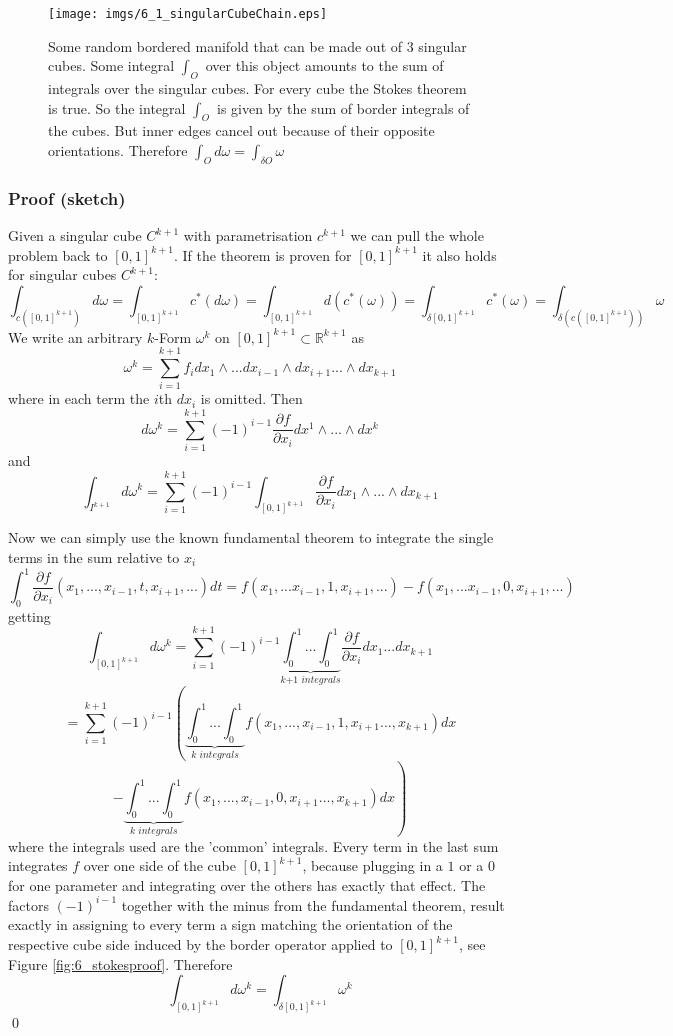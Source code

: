 \begin{figure}[t]
\begin{center}
\texttt{[image: imgs/6\_1\_singularCubeChain.eps]}
\end{center}
\caption{Some random bordered manifold that can be made out of 3 singular cubes. Some integral $\int_O$ over this object amounts to the sum of integrals over the singular cubes. For every cube the Stokes theorem is true. So the integral $\int_O$ is given by the sum of border integrals of the cubes. But inner edges cancel out because of their opposite orientations. Therefore $\int_O d\omega= \int_{\delta O}\omega$} 
\label{fig::6_1_singularCubes}
\end{figure}

\subsubsection{Proof (sketch)}

Given a singular cube $C^{k+1}$ with parametrisation $c^{k+1}$ we can pull the whole problem back to $[0,1]^{k+1}$. If the theorem is proven for $[0,1]^{k+1}$ it also holds for singular cubes $C^{k+1}$:
\[\int_{c([0,1]^{k+1})}d \omega = \int_{[0,1]^{k+1}} c^*(d\omega) = \int_{[0,1]^{k+1}} d(c^*(\omega)) = \int_{\delta [0,1]^{k+1}} c^*(\omega) = \int_{\delta(c([0,1]^{k+1}))} \omega\] 
We write an arbitrary $k$-Form $\omega^k$ on $[0,1]^{k+1} \subset \mathbb R^{k+1}$ as 
\[\omega^k = \sum_{i=1}^{k+1} f_i dx_1 \wedge...dx_{i-1} \wedge dx_{i+1} ...\wedge dx_{k+1}\]
where in each term the $i$th $dx_i$ is omitted. Then
\[d\omega^k = \sum_{i=1}^{k+1}(-1)^{i-1}\frac{\partial f}{\partial x_i}dx^1\wedge ... \wedge dx^k\]
and
\[\int_{I^{k+1}} d \omega^k = \sum_{i=1}^{k+1}(-1)^{i-1} \int_{[0,1]^{k+1}} \frac{\partial f}{\partial x_i} dx_1 \wedge...\wedge dx_{k+1}\]


Now we can simply use the known fundamental theorem to integrate the single terms in the sum relative to $x_i$
\[\int_{0}^1 \frac{\partial f}{\partial x_i} (x_1,...,x_{i-1},t,x_{i+1},...) dt = f(x_1,...x_{i-1},1,x_{i+1},...) - f(x_1,...x_{i-1},0,x_{i+1},...)\]
getting 
\[\int_{[0,1]^{k+1}} d \omega^k = \sum_{i=1}^{k+1}(-1)^{i-1} \underbrace{\int_{0}^1...\int_{0}^1}_{\textit{k+1 integrals}} \frac{\partial f}{\partial x_i} dx_1...dx_{k+1}\]
\[= \sum_{i=1}^{k+1}(-1)^{i-1} \left(\underbrace{\int_{0}^1...\int_{0}^1}_{\textit{k integrals}} f(x_1,...,x_{i-1},1,x_{i+1}...,x_{k+1}) dx \right.\]
\[- \left. \underbrace{\int_{0}^1...\int_{0}^1}_{\textit{k integrals}} f(x_1,...,x_{i-1},0,x_{i+1}...,x_{k+1}) dx \right)\]
where the integrals used are the 'common' integrals. Every term in the last sum integrates $f$ over one side of the cube $[0,1]^{k+1}$, because plugging in a $1$ or a $0$ for one parameter and integrating over the others has exactly that effect. The factors $(-1)^{i-1}$ together with the minus from the fundamental theorem, result exactly in assigning to every term a sign matching the orientation of the respective cube side induced by the border operator applied to $[0,1]^{k+1}$, see Figure \ref{fig:6_stokesproof}. Therefore
\[\int_{[0,1]^{k+1}} d \omega^k = \int_{\delta [0,1]^{k+1}}\omega^k\]
\qed

